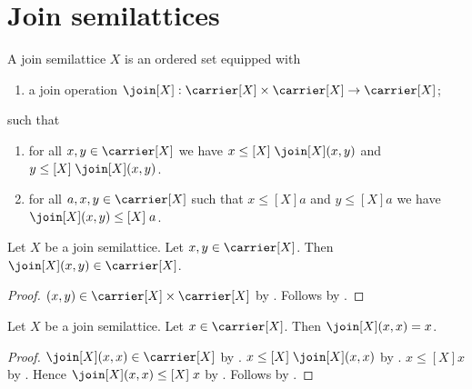 \section{Join semilattices}




\begin{struct}\label{join_semilattice}
    A join semilattice $X$ is an ordered set
    equipped with
    \begin{enumerate}
        \item\label{join_graph}
            a join operation
            $\join[X]:\carrier[X]\times\carrier[X]\to\carrier[X]$;
    \end{enumerate}
    such that
    \begin{enumerate}
        \item\label{join_ub}
            for all $x,y\in\carrier[X]$ we have
                $x\mathrel{\leq[X]}\join[X](x,y)$ and
                $y\mathrel{\leq[X]}\join[X](x,y)$.
        \item\label{join_lub}
            for all $a,x,y\in\carrier[X]$ such that
                $x\mathrel{\leq[X]}a$ and $y\mathrel{\leq[X]}a$ we have
                $\join[X](x,y)\mathrel{\leq[X]}a$.
    \end{enumerate}
\end{struct}

\begin{proposition}\label{join_type}
    Let $X$ be a join semilattice.
    Let $x,y\in\carrier[X]$.
    Then $\join[X](x,y)\in\carrier[X]$.
\end{proposition}
\begin{proof}
    $(x,y)\in\carrier[X]\times\carrier[X]$ by
        .
    Follows by .
\end{proof}

\begin{proposition}\label{join_idempotent}
    Let $X$ be a join semilattice.
    Let $x\in\carrier[X]$.
    Then $\join[X](x,x)=x$.
\end{proposition}
\begin{proof}
    $\join[X](x,x)\in\carrier[X]$ by .
    $x\mathrel{\leq[X]}\join[X](x,x)$ by .
    $x\mathrel{\leq[X]}x$ by
        .
    Hence $\join[X](x,x)\mathrel{\leq[X]}x$ by .
    Follows by
        .
\end{proof}

